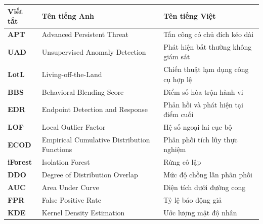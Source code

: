 \documentclass[../main.tex]{subfiles}
\begin{document}
\begin{longtable}{l p{7cm} p{6cm}}
	\hline
   \textbf{Viết tắt}  & \textbf{Tên tiếng Anh}	& \textbf{Tên tiếng Việt} \\ \hline 
	\textbf{APT} & Advanced Persistent Threat & Tấn công có chủ đích kéo dài \\
	\textbf{UAD} & Unsupervised Anomaly Detection & Phát hiện bất thường không giám sát \\
	\textbf{LotL} & Living-off-the-Land & Chiến thuật lạm dụng công cụ hợp lệ \\
	\textbf{BBS} & Behavioral Blending Score & Điểm số hòa trộn hành vi \\
	\textbf{EDR} & Endpoint Detection and Response & Phản hồi và phát hiện tại điểm cuối \\
	\textbf{LOF} & Local Outlier Factor & Hệ số ngoại lai cục bộ \\
	\textbf{ECOD} & Empirical Cumulative Distribution Functions & Phân phối tích lũy thực nghiệm \\
	\textbf{iForest} & Isolation Forest & Rừng cô lập \\
	\textbf{DDO} & Degree of Distribution Overlap & Mức độ chồng lấn phân phối \\
	\textbf{AUC} & Area Under Curve & Diện tích dưới đường cong \\
	\textbf{FPR} & False Positive Rate & Tỷ lệ báo động giả \\
	\textbf{KDE} & Kernel Density Estimation & Ước lượng mật độ nhân \\
    \hline
\end{longtable}
\end{document}
